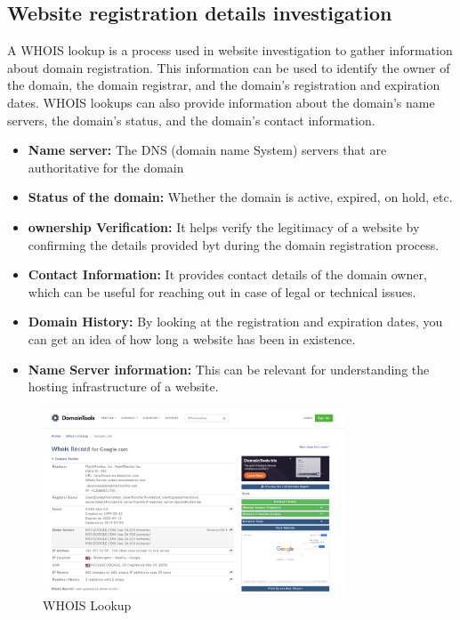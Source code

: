 \documentclass[11pt]{article}
\begin{document}
\subsection{\textbf{Website registration details investigation}}
A WHOIS lookup is a process used in website investigation to gather information about domain registration. This information can be used to identify the owner of the domain, the domain registrar, and the domain’s registration and expiration dates. WHOIS lookups can also provide information about the domain’s name servers, the domain’s status, and the domain’s contact information.
\begin{itemize}
    \item \textbf{Name server:} The DNS (domain name System) servers that are authoritative for the domain
    \item \textbf{Status of the domain:} Whether the domain is active, expired, on hold, etc.
    \item \textbf{ownership Verification:} It helps verify the legitimacy of a website by confirming the details provided byt during the domain registration process.
    \item \textbf{Contact Information:} It provides contact details of the domain owner, which can be useful for reaching out in case of legal or technical issues.
    \item \textbf{Domain History:} By looking at the registration and expiration dates, you can get an idea of how long a website has been in existence.
    \item \textbf{Name Server information:} This can be relevant for understanding the hosting infrastructure of a website.
\end{itemize}

\begin{figure}[H]
    \centering
    \includegraphics[width=0.8\textwidth]{./imgs/whois.png}
    \caption{WHOIS Lookup}
    \label{fig:whois}
\end{figure}
\end{document}
